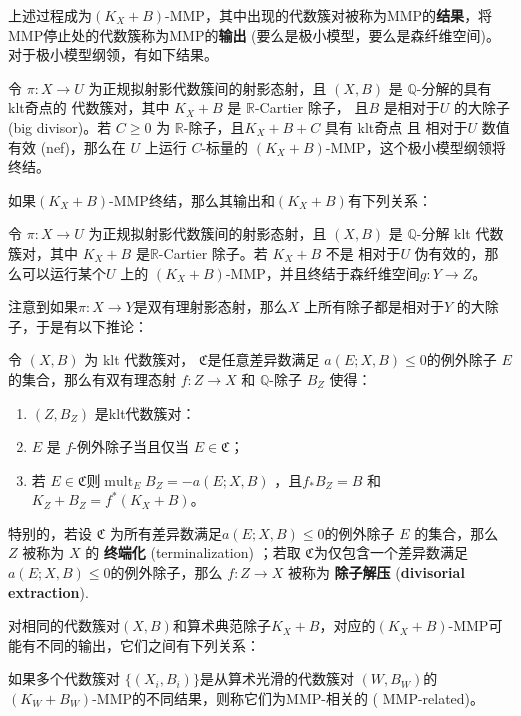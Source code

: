 上述过程成为$(K_{X}+B)$-MMP，其中出现的代数簇对被称为MMP的\textbf{结果}，将MMP停止处的代数簇称为MMP的\textbf{输出} (要么是极小模型，要么是森纤维空间)。对于极小模型纲领，有如下结果。
\begin{theorem}[标量MMP的终结定理]
  \cite[Corollary 1.4.2]{BCHM10} 令 $ \pi: X\to U $ 为正规拟射影代数簇间的射影态射，且 $(X, B)$ 是  $\mathbb{Q}$-分解的具有 klt奇点的 代数簇对，其中 $K_{X}+B$ 是 $\mathbb{R}$-Cartier 除子， 且$B$ 是相对于$U$ 的大除子 (big divisor)。若 $C\geqslant0$ 为 $\mathbb{R}$-除子，且$K_{X}+B+C$ 具有 klt奇点 且 相对于$U$ 数值有效 (nef)，那么在 $U$ 上运行 $C$-标量的  $(K_{X}+B)$-MMP，这个极小模型纲领将终结。
\end{theorem}

如果$(K_{X}+B)$-MMP终结，那么其输出和$(K_{X}+B)$有下列关系：
\begin{theorem}[极小模型输出]\label{notpseudoeffmfs}
  \cite[Corollary 1.3.3]{BCHM10} 令 $ \pi: X\to U $ 为正规拟射影代数簇间的射影态射，且 $(X, B)$ 是 $\mathbb{Q}$-分解 klt 代数簇对，其中 $K_{X}+B$ 是$\mathbb{R}$-Cartier 除子。若 $K_{X}+B$ 不是 相对于$U$ 伪有效的，那么可以运行某个$U$ 上的  $(K_{X}+B)$-MMP，并且终结于森纤维空间$g:Y\to Z$。
\end{theorem}
注意到如果$ \pi:X \to Y$是双有理射影态射，那么$X$ 上所有除子都是相对于$Y$ 的大除子，于是有以下推论：   
\begin{corollary}\label{extraction}
  \cite[Corollary 13.7]{haconMinimalModelProgram2012} 令 $ (X,B) $ 为 klt 代数簇对， $\mathfrak{C}$是任意差异数满足 $ a(E;X,B)\leqslant 0 $的例外除子 $E$ 的集合，那么有双有理态射 $ f:Z\to X $ 和 $ \mathbb{Q} $-除子 $ B_Z $ 使得：
  \begin{enumerate}
    \item $ (Z,B_Z) $ 是klt代数簇对：
    \item $ E $ 是 $f$-例外除子当且仅当 $ E\in \mathfrak{C} $；
    \item  若 $E \in \mathfrak{C}$则$ \operatorname{mult}_{E}B_Z=-a(E;X,B) $ ，且$ f_*B_Z=B $ 和 $ K_Z+B_Z=f^*(K_X+B) $。
  \end{enumerate}
  特别的，若设 $\mathfrak{C}$ 为所有差异数满足$a(E; X, B)\leqslant 0$的例外除子 $E$ 的集合，那么 $ Z $ 被称为 $X$ 的 \textbf{终端化} (terminalization) ；若取 $\mathfrak{C}$为仅包含一个差异数满足 $a(E; X, B)\leqslant 0$的例外除子，那么 $ f: Z\to X $ 被称为 \textbf{除子解压} (\textbf{divisorial extraction}).
\end{corollary}
对相同的代数簇对$(X,B)$和算术典范除子$K_{X}+B$，对应的$(K_{X}+B)$-MMP可能有不同的输出，它们之间有下列关系：
\begin{definition}
  \cite[Definition 3.3]{brunoLogSarkisovProgram1995}
  如果多个代数簇对 $ \{(X_i,B_i)\} $是从算术光滑的代数簇对 $(W,B_{W})$的 $(K_{W}+B_{W}) $-MMP的不同结果，则称它们为MMP-相关的 ( MMP-related)。 
\end{definition}

